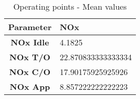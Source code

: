 \begin{table}[h!]
  \centering
  \begin{tabularx}{\textwidth}{||c|X||}
  \hline
    \cellcolor{gray!20}\textbf{Parameter} & \cellcolor{gray!20}\textbf{NOx} \\ [0.5ex]
  \hline\hline
\centering
    \cellcolor{gray!20}\textbf{NOx Idle} & 4.1825 \\
  \hline
    \cellcolor{gray!20}\textbf{NOx T/O} & 22.870833333333334 \\
  \hline
    \cellcolor{gray!20}\textbf{NOx C/O} & 17.90175925925926 \\
  \hline
    \cellcolor{gray!20}\textbf{NOx App} & 8.857222222222223 \\
  \hline
  \end{tabularx}
  \caption{Operating points - Mean values}
  \label{tab:means}
\end{table}
